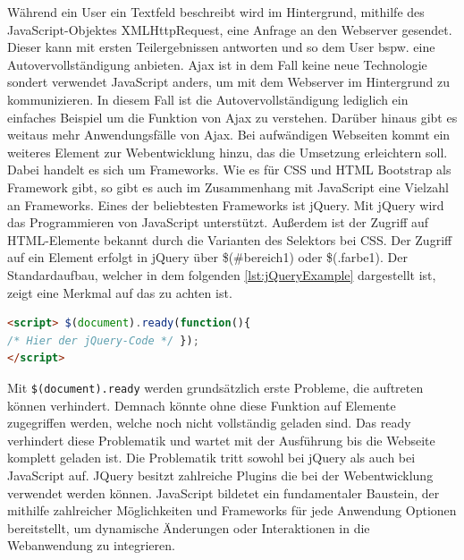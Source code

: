 \documentclass[a4paper,titlepage,halfparskip,12pt]{scrreprt}
\begin{document}
\begin{onehalfspacing}
Während ein User ein Textfeld beschreibt wird im Hintergrund, mithilfe des JavaScript-Objektes XMLHttpRequest, eine Anfrage an den Webserver gesendet. Dieser kann mit ersten Teilergebnissen antworten und so dem User bspw. eine Autovervollständigung anbieten. \ac{Ajax} ist in dem Fall keine neue Technologie sondert verwendet JavaScript anders, um mit dem Webserver im Hintergrund zu kommunizieren. In diesem Fall ist die Autovervollständigung lediglich ein einfaches Beispiel um die Funktion von \ac{Ajax} zu verstehen. Darüber hinaus gibt es weitaus mehr Anwendungsfälle von \ac{Ajax}. Bei aufwändigen Webseiten kommt ein weiteres Element zur Webentwicklung hinzu, das die Umsetzung erleichtern soll. Dabei handelt es sich um Frameworks. Wie es für \ac{CSS} und \ac{HTML} Bootstrap als Framework gibt, so gibt es auch im Zusammenhang mit JavaScript eine Vielzahl an Frameworks. Eines der beliebtesten Frameworks ist jQuery. Mit jQuery wird das Programmieren von JavaScript unterstützt. Außerdem ist der Zugriff auf HTML-Elemente bekannt durch die Varianten des Selektors bei \ac{CSS}. Der Zugriff auf ein Element erfolgt in jQuery über \$(\dq \#bereich1\dq) oder \$(\dq .farbe1\dq). Der Standardaufbau, welcher in dem folgenden \autoref{lst:jQueryExample} dargestellt ist, zeigt eine Merkmal auf das zu achten ist.
\begin{lstlisting}[language=HTML,caption=Example Listing of jQuery,label={lst:jQueryExample}]
<script> $(document).ready(function(){
/* Hier der jQuery-Code */ });
</script>
\end{lstlisting}
Mit \texttt{\$(document).ready} werden grundsätzlich erste Probleme, die auftreten können verhindert. Demnach könnte ohne diese Funktion auf Elemente zugegriffen werden, welche noch nicht vollständig geladen sind. Das ready verhindert diese Problematik und wartet mit der Ausführung bis die Webseite komplett geladen ist. Die Problematik tritt sowohl bei jQuery als auch bei JavaScript auf. JQuery besitzt zahlreiche Plugins die bei der Webentwicklung verwendet werden können. JavaScript bildetet ein fundamentaler Baustein, der mithilfe zahlreicher Möglichkeiten und Frameworks für jede Anwendung Optionen bereitstellt, um dynamische Änderungen oder Interaktionen in die Webanwendung zu integrieren.\cite{buhler2018webtechnologien}
\pagebreak


\end{onehalfspacing}
\end{document}
